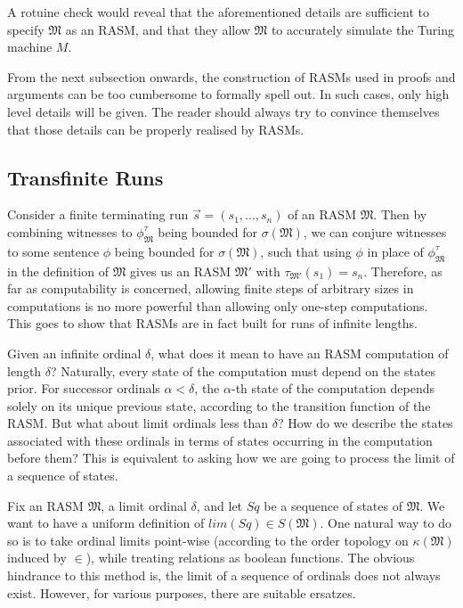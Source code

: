 \documentclass[12pt]{article}
\numberwithin{equation}{section}
\begin{document}
\begin{ex}
A rotuine check would reveal that the aforementioned details are sufficient to specify $\mathfrak{M}$ as an RASM, and that they allow $\mathfrak{M}$ to accurately simulate the Turing machine $M$. 
\end{ex}

From the next subsection onwards, the construction of RASMs used in proofs and arguments can be too cumbersome to formally spell out. In such cases, only high level details will be given. The reader should always try to convince themselves that those details can be properly realised by RASMs.

\subsection{Transfinite Runs}

Consider a finite terminating run $\Vec{s} = (s_1, \dots, s_n)$ of an RASM $\mathfrak{M}$. Then by combining witnesses to $\phi^{\tau}_{\mathfrak{M}}$ being bounded for $\sigma(\mathfrak{M})$, we can conjure witnesses to some sentence $\phi$ being bounded for $\sigma(\mathfrak{M})$, such that using $\phi$ in place of $\phi^{\tau}_{\mathfrak{M}}$ in the definition of $\mathfrak{M}$ gives us an RASM $\mathfrak{M}'$ with $\tau_{\mathfrak{M}'}(s_1) = s_n$. Therefore, as far as computability is concerned, allowing finite steps of arbitrary sizes in computations is no more powerful than allowing only one-step computations. This goes to show that
RASMs are in fact built for runs of infinite lengths.

Given an infinite ordinal $\delta$, what does it mean to have an RASM computation of length $\delta$? Naturally, every state of the computation must depend on the states prior. For successor ordinals $\alpha < \delta$, the $\alpha$-th state of the computation depends solely on its unique previous state, according to the transition function of the RASM. But what about limit ordinals less than $\delta$? How do we describe the states associated with these ordinals in terms of states occurring in the computation before them? This is equivalent to asking how we are going to process the limit of a sequence of states.

Fix an RASM $\mathfrak{M}$, a limit ordinal $\delta$, and let $Sq$ be a sequence of states of $\mathfrak{M}$. We want to have a uniform definition of $lim(Sq) \in S(\mathfrak{M})$. One natural way to do so is to take ordinal limits point-wise (according to the order topology on $\kappa(\mathfrak{M})$ induced by $\in$), while treating relations as boolean functions. The obvious hindrance to this method is, the limit of a sequence of ordinals does not always exist. However, for various purposes, there are suitable ersatzes.
\end{document}
